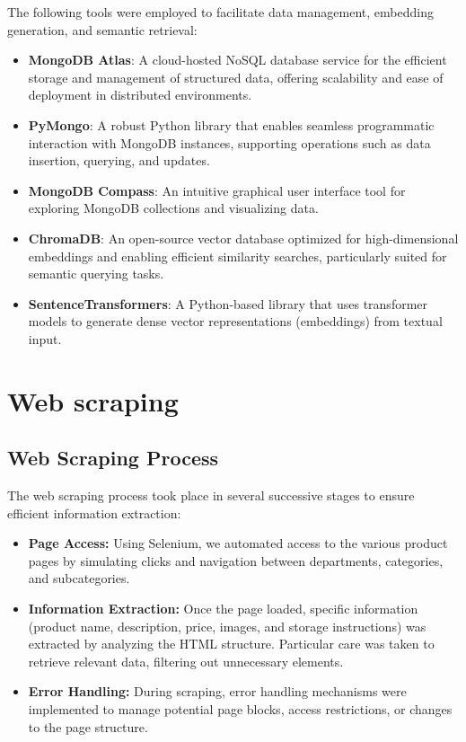 The following tools were employed to facilitate data management, embedding generation, and semantic retrieval:
\begin{itemize}[label=$\bullet$]
    \item \textbf{MongoDB Atlas}: A cloud-hosted NoSQL database service for the efficient storage and management of structured data, offering scalability and ease of deployment in distributed environments.
    \item \textbf{PyMongo}: A robust Python library that enables seamless programmatic interaction with MongoDB instances, supporting operations such as data insertion, querying, and updates.
    \item \textbf{MongoDB Compass}: An intuitive graphical user interface tool for exploring MongoDB collections and visualizing data.
    \item \textbf{ChromaDB}: An open-source vector database optimized for high-dimensional embeddings and enabling efficient similarity searches, particularly suited for semantic querying tasks.
    \item \textbf{SentenceTransformers}: A Python-based library that uses transformer models to generate dense vector representations (embeddings) from textual input.
\end{itemize}


\section{Web scraping}
\subsection{Web Scraping Process}
The web scraping process took place in several successive stages to ensure efficient information extraction:
\begin{itemize}
    \item \textbf{Page Access:}
    Using Selenium, we automated access to the various product pages by simulating clicks and navigation between departments, categories, and subcategories.
    \item \textbf{Information Extraction:} Once the page loaded, specific information (product name, description, price, images, and storage instructions) was extracted by analyzing the HTML structure. Particular care was taken to retrieve relevant data, filtering out unnecessary elements.
    \item \textbf{Error Handling:} During scraping, error handling mechanisms were implemented to manage potential page blocks, access restrictions, or changes to the page structure.
\end{itemize}

